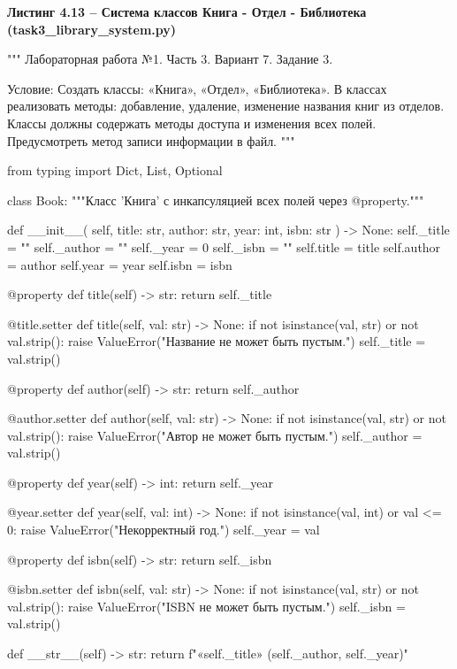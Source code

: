 \documentclass[14pt,a4paper]{extarticle}
\newcommand{\listingtitle}[1]{%
  \par\vspace{8pt}%
  \noindent\hspace*{1.25cm}\textbf{#1}\par\vspace{2pt}%
}
\begin{document}
\listingtitle{Листинг 4.13 -- Система классов Книга - Отдел - Библиотека (task3\_library\_system.py)}
\begin{CodeListing}
"""
Лабораторная работа №1. Часть 3.
Вариант 7. Задание 3.

Условие:
Создать классы: «Книга», «Отдел», «Библиотека». В классах реализовать
методы: добавление, удаление, изменение названия книг из отделов.
Классы должны содержать методы доступа и изменения всех полей.
Предусмотреть метод записи информации в файл.
"""

from typing import Dict, List, Optional


class Book:
    """Класс 'Книга' с инкапсуляцией всех полей через @property."""

    def __init__(
        self, title: str, author: str, year: int, isbn: str
    ) -> None:
        self._title = ""
        self._author = ""
        self._year = 0
        self._isbn = ""
        self.title = title
        self.author = author
        self.year = year
        self.isbn = isbn

    @property
    def title(self) -> str:
        return self._title

    @title.setter
    def title(self, val: str) -> None:
        if not isinstance(val, str) or not val.strip():
            raise ValueError("Название не может быть пустым.")
        self._title = val.strip()

    @property
    def author(self) -> str:
        return self._author

    @author.setter
    def author(self, val: str) -> None:
        if not isinstance(val, str) or not val.strip():
            raise ValueError("Автор не может быть пустым.")
        self._author = val.strip()

    @property
    def year(self) -> int:
        return self._year

    @year.setter
    def year(self, val: int) -> None:
        if not isinstance(val, int) or val <= 0:
            raise ValueError("Некорректный год.")
        self._year = val

    @property
    def isbn(self) -> str:
        return self._isbn

    @isbn.setter
    def isbn(self, val: str) -> None:
        if not isinstance(val, str) or not val.strip():
            raise ValueError("ISBN не может быть пустым.")
        self._isbn = val.strip()

    def __str__(self) -> str:
        return f"«{self._title}» ({self._author}, {self._year})"



\end{CodeListing}
\end{document}

